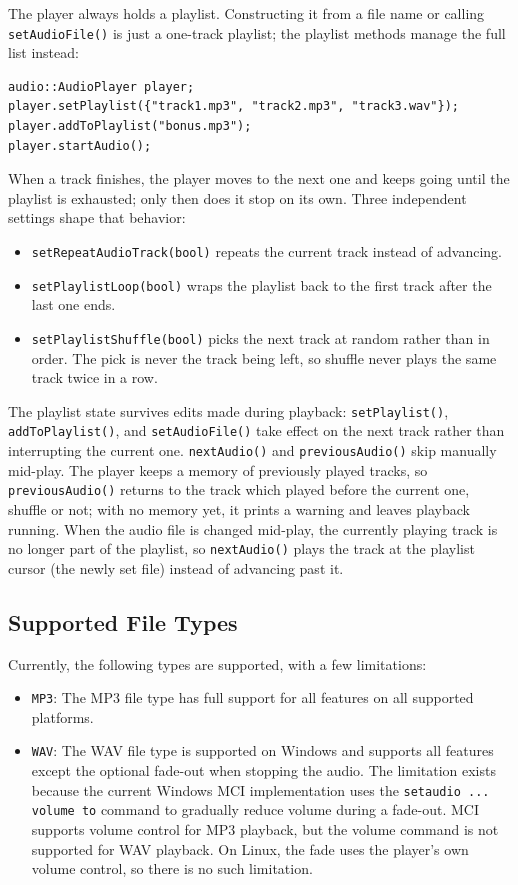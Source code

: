 The player always holds a playlist. Constructing it from a file name or calling \texttt{setAudioFile()} is just a one-track playlist; the playlist methods manage the full list instead:
\begin{lstlisting}[style=cppstyle]
audio::AudioPlayer player;
player.setPlaylist({"track1.mp3", "track2.mp3", "track3.wav"});
player.addToPlaylist("bonus.mp3");
player.startAudio();
\end{lstlisting}
When a track finishes, the player moves to the next one and keeps going until the playlist is exhausted; only then does it stop on its own. Three independent settings shape that behavior:
\begin{itemize}\itemsep0em
	\item \texttt{setRepeatAudioTrack(bool)} repeats the current track instead of advancing.
	\item \texttt{setPlaylistLoop(bool)} wraps the playlist back to the first track after the last one ends.
	\item \texttt{setPlaylistShuffle(bool)} picks the next track at random rather than in order. The pick is never the track being left, so shuffle never plays the same track twice in a row.
\end{itemize}
The playlist state survives edits made during playback: \texttt{setPlaylist()}, \texttt{addToPlaylist()}, and \texttt{setAudioFile()} take effect on the next track rather than interrupting the current one. \texttt{nextAudio()} and \texttt{previousAudio()} skip manually mid-play. The player keeps a memory of previously played tracks, so \texttt{previousAudio()} returns to the track which played before the current one, shuffle or not; with no memory yet, it prints a warning and leaves playback running. When the audio file is changed mid-play, the currently playing track is no longer part of the playlist, so \texttt{nextAudio()} plays the track at the playlist cursor (the newly set file) instead of advancing past it.

\subsection{Supported File Types}

Currently, the following types are supported, with a few limitations:
\begin{itemize}
	\item \texttt{MP3}: The MP3 file type has full support for all features on all supported platforms.
	\item \texttt{WAV}: The WAV file type is supported on Windows and supports all features except the optional fade-out when stopping the audio. The limitation exists because the current Windows MCI implementation uses the \texttt{setaudio ... volume to} command to gradually reduce volume during a fade-out. MCI supports volume control for MP3 playback, but the volume command is not supported for WAV playback. On Linux, the fade uses the player's own volume control, so there is no such limitation.
\end{itemize}

